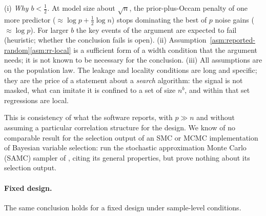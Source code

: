\begin{remark}\label{rem:reported-random-asm}
(i) \emph{Why $b<\tfrac12$.} At model size about $\sqrt n$, the prior-plus-Occam penalty of one more predictor
($\approx\log p+\tfrac12\log n$) stops dominating the best of $p$ noise gains ($\approx\log p$). For larger $b$ the key
events of the argument are expected to fail (heuristic; whether the conclusion fails is open).
(ii) Assumption~\ref{asm:reported-random}\ref{asm:rr-local} is a sufficient form of a width condition that the argument needs; it is not known to
be necessary for the conclusion.
(iii) All assumptions are on the population law. The leakage and locality conditions are long and specific; they are the
price of a statement about a \emph{search} algorithm: the signal is not masked, what can imitate it is confined to a set
of size $n^b$, and within that set regressions are local.
\end{remark}

\begin{remark}\label{rem:SL-reported}
This is consistency of what the software reports, with $p\gg n$ and without assuming a particular correlation
structure for the design. We know of no comparable result for
the selection output of an SMC or MCMC implementation of Bayesian variable selection: \citet{SongLiang2015} run the stochastic
approximation Monte Carlo (SAMC) sampler of \citet{LiangLiuCarroll2007}, citing its general properties, but prove nothing about its selection output.
\end{remark}

\paragraph{Fixed design.} The same conclusion holds for a fixed design under sample-level conditions.


